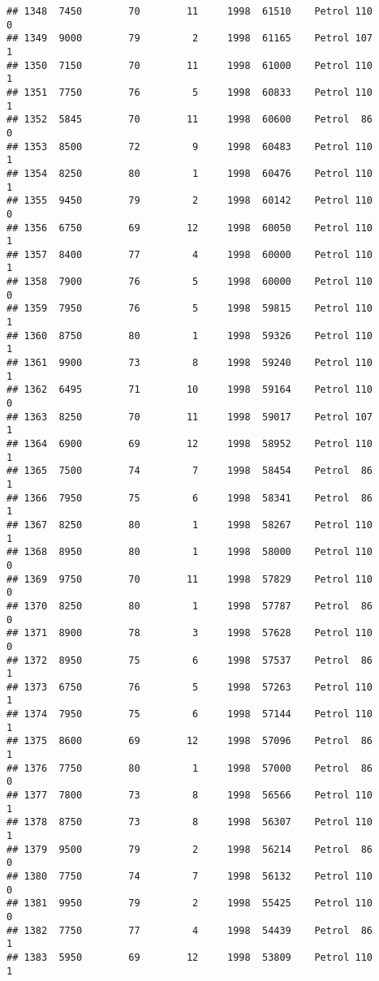 \documentclass[]{article}
\begin{document}
\begin{verbatim}
## 1348  7450        70        11     1998  61510    Petrol 110         0
## 1349  9000        79         2     1998  61165    Petrol 107         1
## 1350  7150        70        11     1998  61000    Petrol 110         1
## 1351  7750        76         5     1998  60833    Petrol 110         1
## 1352  5845        70        11     1998  60600    Petrol  86         0
## 1353  8500        72         9     1998  60483    Petrol 110         1
## 1354  8250        80         1     1998  60476    Petrol 110         1
## 1355  9450        79         2     1998  60142    Petrol 110         0
## 1356  6750        69        12     1998  60050    Petrol 110         1
## 1357  8400        77         4     1998  60000    Petrol 110         1
## 1358  7900        76         5     1998  60000    Petrol 110         0
## 1359  7950        76         5     1998  59815    Petrol 110         1
## 1360  8750        80         1     1998  59326    Petrol 110         1
## 1361  9900        73         8     1998  59240    Petrol 110         1
## 1362  6495        71        10     1998  59164    Petrol 110         0
## 1363  8250        70        11     1998  59017    Petrol 107         1
## 1364  6900        69        12     1998  58952    Petrol 110         1
## 1365  7500        74         7     1998  58454    Petrol  86         1
## 1366  7950        75         6     1998  58341    Petrol  86         1
## 1367  8250        80         1     1998  58267    Petrol 110         1
## 1368  8950        80         1     1998  58000    Petrol 110         0
## 1369  9750        70        11     1998  57829    Petrol 110         0
## 1370  8250        80         1     1998  57787    Petrol  86         0
## 1371  8900        78         3     1998  57628    Petrol 110         0
## 1372  8950        75         6     1998  57537    Petrol  86         1
## 1373  6750        76         5     1998  57263    Petrol 110         1
## 1374  7950        75         6     1998  57144    Petrol 110         1
## 1375  8600        69        12     1998  57096    Petrol  86         1
## 1376  7750        80         1     1998  57000    Petrol  86         0
## 1377  7800        73         8     1998  56566    Petrol 110         1
## 1378  8750        73         8     1998  56307    Petrol 110         1
## 1379  9500        79         2     1998  56214    Petrol  86         0
## 1380  7750        74         7     1998  56132    Petrol 110         0
## 1381  9950        79         2     1998  55425    Petrol 110         0
## 1382  7750        77         4     1998  54439    Petrol  86         1
## 1383  5950        69        12     1998  53809    Petrol 110         1

\end{verbatim}
\end{document}
